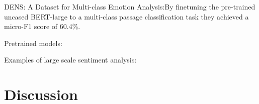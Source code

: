 \documentclass[11pt]{article}
\begin{document}
DENS: A Dataset for Multi-class Emotion Analysis:By finetuning the pre-trained uncased BERT-large to a multi-class passage classification task they achieved a micro-F1 score of 60.4\%. 





Pretrained models:



Examples of large scale sentiment analysis:





\section{Discussion}
\label{sec:discussion}




\end{document}
